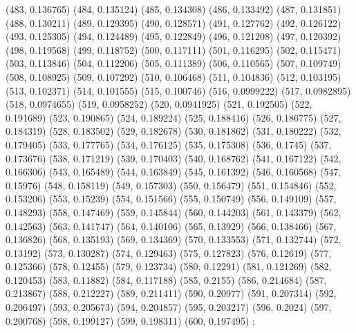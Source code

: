 {					(483, 0.136765)
					(484, 0.135124)
					(485, 0.134308)
					(486, 0.133492)
					(487, 0.131851)
					(488, 0.130211)
					(489, 0.129395)
					(490, 0.128571)
					(491, 0.127762)
					(492, 0.126122)
					(493, 0.125305)
					(494, 0.124489)
					(495, 0.122849)
					(496, 0.121208)
					(497, 0.120392)
					(498, 0.119568)
					(499, 0.118752)
					(500, 0.117111)
					(501, 0.116295)
					(502, 0.115471)
					(503, 0.113846)
					(504, 0.112206)
					(505, 0.111389)
					(506, 0.110565)
					(507, 0.109749)
					(508, 0.108925)
					(509, 0.107292)
					(510, 0.106468)
					(511, 0.104836)
					(512, 0.103195)
					(513, 0.102371)
					(514, 0.101555)
					(515, 0.100746)
					(516, 0.0999222)
					(517, 0.0982895)
					(518, 0.0974655)
					(519, 0.0958252)
					(520, 0.0941925)
					(521, 0.192505)
					(522, 0.191689)
					(523, 0.190865)
					(524, 0.189224)
					(525, 0.188416)
					(526, 0.186775)
					(527, 0.184319)
					(528, 0.183502)
					(529, 0.182678)
					(530, 0.181862)
					(531, 0.180222)
					(532, 0.179405)
					(533, 0.177765)
					(534, 0.176125)
					(535, 0.175308)
					(536, 0.1745)
					(537, 0.173676)
					(538, 0.171219)
					(539, 0.170403)
					(540, 0.168762)
					(541, 0.167122)
					(542, 0.166306)
					(543, 0.165489)
					(544, 0.163849)
					(545, 0.161392)
					(546, 0.160568)
					(547, 0.15976)
					(548, 0.158119)
					(549, 0.157303)
					(550, 0.156479)
					(551, 0.154846)
					(552, 0.153206)
					(553, 0.15239)
					(554, 0.151566)
					(555, 0.150749)
					(556, 0.149109)
					(557, 0.148293)
					(558, 0.147469)
					(559, 0.145844)
					(560, 0.144203)
					(561, 0.143379)
					(562, 0.142563)
					(563, 0.141747)
					(564, 0.140106)
					(565, 0.13929)
					(566, 0.138466)
					(567, 0.136826)
					(568, 0.135193)
					(569, 0.134369)
					(570, 0.133553)
					(571, 0.132744)
					(572, 0.13192)
					(573, 0.130287)
					(574, 0.129463)
					(575, 0.127823)
					(576, 0.12619)
					(577, 0.125366)
					(578, 0.12455)
					(579, 0.123734)
					(580, 0.12291)
					(581, 0.121269)
					(582, 0.120453)
					(583, 0.11882)
					(584, 0.117188)
					(585, 0.2155)
					(586, 0.214684)
					(587, 0.213867)
					(588, 0.212227)
					(589, 0.211411)
					(590, 0.20977)
					(591, 0.207314)
					(592, 0.206497)
					(593, 0.205673)
					(594, 0.204857)
					(595, 0.203217)
					(596, 0.2024)
					(597, 0.200768)
					(598, 0.199127)
					(599, 0.198311)
					(600, 0.197495)
				};
